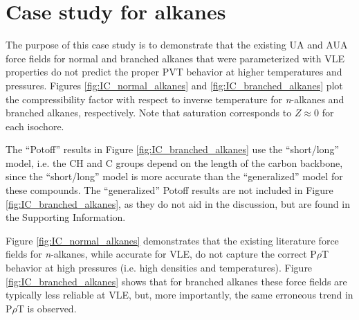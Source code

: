 \documentclass[journal=jctc,manuscript=article]{achemso}
\begin{document}
\section{Case study for alkanes} \label{Case Study}

The purpose of this case study is to demonstrate that the existing UA and AUA force fields for normal and branched alkanes that were parameterized with VLE properties do not predict the proper PVT behavior at higher temperatures and pressures. Figures \ref{fig:IC_normal_alkanes} and \ref{fig:IC_branched_alkanes} plot the compressibility factor with respect to inverse temperature for \textit{n}-alkanes and branched alkanes, respectively. Note that saturation corresponds to $Z \approx 0$ for each isochore. 

The ``Potoff'' results in Figure \ref{fig:IC_branched_alkanes} use the ``short/long'' model, i.e. the CH and C groups depend on the length of the carbon backbone, since the ``short/long'' model is more accurate than the ``generalized'' model for these compounds. The ``generalized'' Potoff results are not included in Figure \ref{fig:IC_branched_alkanes}, as they do not aid in the discussion, but are found in the Supporting Information. 



Figure \ref{fig:IC_normal_alkanes} demonstrates that the existing literature force fields for \textit{n}-alkanes, while accurate for VLE, do not capture the correct P$\rho$T behavior at high pressures (i.e. high densities and temperatures). Figure \ref{fig:IC_branched_alkanes} shows that for branched alkanes these force fields are typically less reliable at VLE, but, more importantly, the same erroneous trend in P$\rho$T is observed. 
\end{document}
